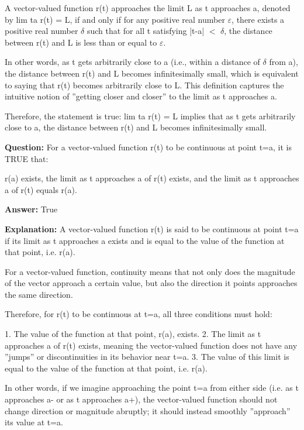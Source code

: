 \documentclass{article}
\begin{document}
A vector-valued function r(t) approaches the limit L as t approaches a, denoted by lim t{\textrightarrow}a r(t) = L, if and only if for any positive real number \ensuremath{\varepsilon}, there exists a positive real number \ensuremath{\delta} such that for all t satisfying |t-a| \ensuremath{<} \ensuremath{\delta}, the distance between r(t) and L is less than or equal to \ensuremath{\varepsilon}.

In other words, as t gets arbitrarily close to a (i.e., within a distance of \ensuremath{\delta} from a), the distance between r(t) and L becomes infinitesimally small, which is equivalent to saying that r(t) becomes arbitrarily close to L. This definition captures the intuitive notion of ''getting closer and closer'' to the limit as t approaches a.

Therefore, the statement is true: lim t{\textrightarrow}a r(t) = L implies that as t gets arbitrarily close to a, the distance between r(t) and L becomes infinitesimally small.
                
                \vspace{0.5cm} 
        
            
                \textbf {Question:} For a vector-valued function r(t) to be continuous at point t=a, it is TRUE that: 

r(a) exists, 
the limit as t approaches a of r(t) exists, and 
the limit as t approaches a of r(t) equals r(a).
                
                \textbf{Answer:} True

                \textbf{Explanation:} A vector-valued function r(t) is said to be continuous at point t=a if its limit as t approaches a exists and is equal to the value of the function at that point, i.e. r(a). 

For a vector-valued function, continuity means that not only does the magnitude of the vector approach a certain value, but also the direction it points approaches the same direction.

Therefore, for r(t) to be continuous at t=a, all three conditions must hold:

1. The value of the function at that point, r(a), exists.
2. The limit as t approaches a of r(t) exists, meaning the vector-valued function does not have any ''jumps'' or discontinuities in its behavior near t=a.
3. The value of this limit is equal to the value of the function at that point, i.e. r(a).

In other words, if we imagine approaching the point t=a from either side (i.e. as t approaches a- or as t approaches a+), the vector-valued function should not change direction or magnitude abruptly; it should instead smoothly ''approach'' its value at t=a.
\end{document}
